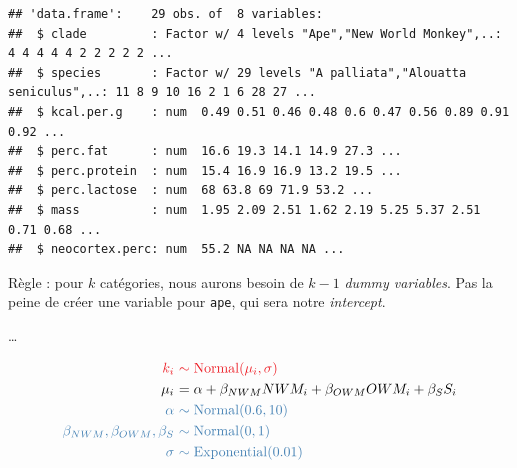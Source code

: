 \documentclass[
  a4paper,11pt,twoside,onecolumn,openright,final,oldfontcommands]{memoir}
\newenvironment{Shaded}{\begin{snugshade}}{\end{snugshade}}
\newcommand{\DecValTok}[1]{\textcolor[rgb]{0.00,0.00,0.81}{#1}}
\newcommand{\KeywordTok}[1]{\textcolor[rgb]{0.13,0.29,0.53}{\textbf{#1}}}
\newcommand{\NormalTok}[1]{#1}
\newcommand{\OperatorTok}[1]{\textcolor[rgb]{0.81,0.36,0.00}{\textbf{#1}}}
\newcommand{\StringTok}[1]{\textcolor[rgb]{0.31,0.60,0.02}{#1}}
\theoremstyle{definition}
\theoremstyle{definition}
\theoremstyle{definition}
\theoremstyle{remark}
\begin{document}
\begin{verbatim}
## 'data.frame':    29 obs. of  8 variables:
##  $ clade         : Factor w/ 4 levels "Ape","New World Monkey",..: 4 4 4 4 4 2 2 2 2 2 ...
##  $ species       : Factor w/ 29 levels "A palliata","Alouatta seniculus",..: 11 8 9 10 16 2 1 6 28 27 ...
##  $ kcal.per.g    : num  0.49 0.51 0.46 0.48 0.6 0.47 0.56 0.89 0.91 0.92 ...
##  $ perc.fat      : num  16.6 19.3 14.1 14.9 27.3 ...
##  $ perc.protein  : num  15.4 16.9 16.9 13.2 19.5 ...
##  $ perc.lactose  : num  68 63.8 69 71.9 53.2 ...
##  $ mass          : num  1.95 2.09 2.51 1.62 2.19 5.25 5.37 2.51 0.71 0.68 ...
##  $ neocortex.perc: num  55.2 NA NA NA NA ...
\end{verbatim}

Règle : pour \(k\) catégories, nous aurons besoin de \(k - 1\) \emph{dummy variables}. Pas la peine de créer une variable pour \texttt{ape}, qui sera notre \emph{intercept}.

\begin{Shaded}
\end{Shaded}

\ldots{}

\[
\begin{aligned}
\color{orangered}{k_{i}} \ &\color{orangered}{\sim \mathrm{Normal}(\mu_{i}, \sigma)} \\
\color{black}{\mu_{i}} \ &\color{black}{= \alpha + \beta_{NWM}NWM_{i} + \beta_{OWM}OWM_{i} + \beta_{S}S_{i}} \\
\color{steelblue}{\alpha} \ &\color{steelblue}{\sim \mathrm{Normal}(0.6, 10)} \\
\color{steelblue}{\beta_{NWM}, \beta_{OWM}, \beta_{S}} \ &\color{steelblue}{\sim \mathrm{Normal}(0, 1)} \\
\color{steelblue}{\sigma} \ &\color{steelblue}{\sim \mathrm{Exponential}(0.01)}
\end{aligned}
\]
\end{document}
